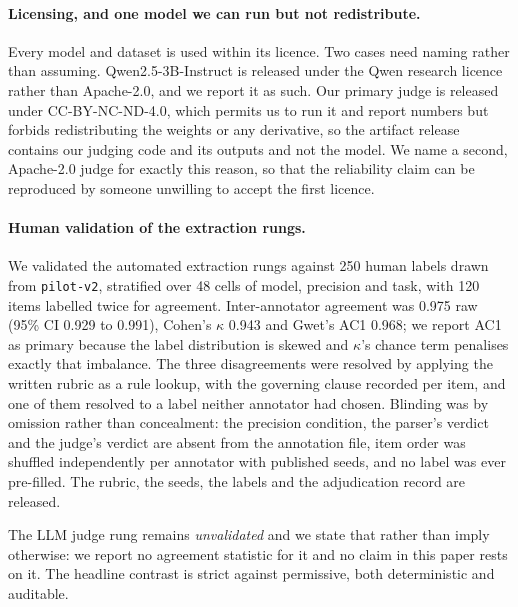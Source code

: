\documentclass[conference]{IEEEtran}
\begin{document}
\paragraph{Licensing, and one model we can run but not redistribute.}
Every model and dataset is used within its licence. Two cases need naming
rather than assuming. Qwen2.5-3B-Instruct is released under the Qwen research
licence rather than Apache-2.0, and we report it as such. Our primary judge is
released under CC-BY-NC-ND-4.0, which permits us to run it and report numbers
but forbids redistributing the weights or any derivative, so the artifact
release contains our judging code and its outputs and not the model. We name a
second, Apache-2.0 judge for exactly this reason, so that the reliability
claim can be reproduced by someone unwilling to accept the first licence.

\paragraph{Human validation of the extraction rungs.}
We validated the automated extraction rungs against 250 human labels drawn from
\texttt{pilot-v2}, stratified over 48 cells of model, precision and task, with 120 items
labelled twice for agreement. Inter-annotator agreement was 0.975 raw (95\% CI 0.929 to
0.991), Cohen's $\kappa$ 0.943 and Gwet's AC1 0.968; we report AC1 as primary because the
label distribution is skewed and $\kappa$'s chance term penalises exactly that imbalance.
The three disagreements were resolved by applying the written rubric as a rule lookup, with
the governing clause recorded per item, and one of them resolved to a label neither
annotator had chosen. Blinding was by omission rather than concealment: the precision
condition, the parser's verdict and the judge's verdict are absent from the annotation file,
item order was shuffled independently per annotator with published seeds, and no label was
ever pre-filled. The rubric, the seeds, the labels and the adjudication record are released.

The LLM judge rung remains \emph{unvalidated} and we state that rather than imply
otherwise: we report no agreement statistic for it and no claim in this paper rests on it.
The headline contrast is strict against permissive, both deterministic and auditable.
\end{document}
